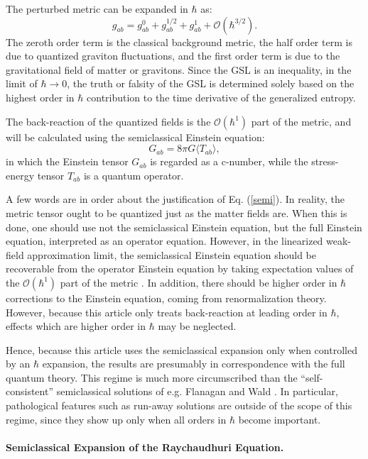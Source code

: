 \documentclass[12pt]{article}
\begin{document}
The perturbed metric can be expanded in $\hbar$ as:
\begin{equation}
g_{ab} = g_{ab}^0 + g_{ab}^{1/2} + g_{ab}^1 + \mathcal{O}(\hbar^{3/2}).
\end{equation}
The zeroth order term is the classical background metric, the half order term is due to quantized graviton fluctuations, and the first order term is due to the gravitational field of matter or gravitons.  Since the GSL is an inequality, in the limit of $\hbar \to 0$, the truth or falsity of the GSL is determined solely based on the highest order in $\hbar$ contribution to the time derivative of the generalized entropy.

The back-reaction of the quantized fields is the $\mathcal{O}(\hbar^1)$ part of the metric, and will be calculated using the semiclassical Einstein equation:
\begin{equation}\label{semi}
G_{ab} = 8\pi G \langle T_{ab} \rangle,
\end{equation}
in which the Einstein tensor $G_{ab}$ is regarded as a c-number, while the stress-energy tensor $T_{ab}$ is a quantum operator.

A few words are in order about the justification of Eq. (\ref{semi}).  In reality, the metric tensor ought to be quantized just as the matter fields are.  When this is done, one should use not the semiclassical Einstein equation, but the full Einstein equation, interpreted as an operator equation.  However, in the linearized weak-field approximation limit, the semiclassical Einstein equation should be recoverable from the operator Einstein equation by taking expectation values of the $\mathcal{O}(\hbar^1)$ part of the metric \cite{10proofs}.  In addition, there should be higher order in $\hbar$ corrections to the Einstein equation, coming from renormalization theory.  However, because this article only treats back-reaction at leading order in $\hbar$, effects which are higher order in $\hbar$ may be neglected.

Hence, because this article uses the semiclassical expansion only when controlled by an $\hbar$ expansion, the results are presumably in correspondence with the full quantum theory.  This regime is much more circumscribed than the ``self-consistent'' semiclassical solutions of e.g. Flanagan and Wald \cite{FW}.  In particular, pathological features such as run-away solutions are outside of the scope of this regime, since they show up only when all orders in $\hbar$ become important.

\paragraph{Semiclassical Expansion of the Raychaudhuri Equation.}
\end{document}
